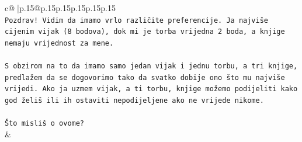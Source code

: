 \documentclass{article}
\begin{document}
{\begin{supertabular}{c@{$\;$}|p{.15\linewidth}@{}p{.15\linewidth}p{.15\linewidth}p{.15\linewidth}p{.15\linewidth}p{.15\linewidth}}
{{{\\ 
\texttt{Pozdrav! Vidim da imamo vrlo različite preferencije. Ja najviše cijenim vijak (8 bodova), dok mi je torba vrijedna 2 boda, a knjige nemaju vrijednost za mene.} \\
\\ 
\texttt{S obzirom na to da imamo samo jedan vijak i jednu torbu, a tri knjige, predlažem da se dogovorimo tako da svatko dobije ono što mu najviše vrijedi. Ako ja uzmem vijak, a ti torbu, knjige možemo podijeliti kako god želiš ili ih ostaviti nepodijeljene ako ne vrijede nikome.} \\
\\ 
\texttt{Što misliš o ovome?} \\
            }
        }
    }
    & \\ \\


\end{supertabular}}
\end{document}

